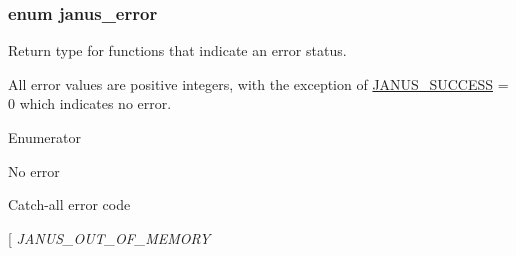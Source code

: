 \subsubsection[{janus\+\_\+error}]{\setlength{\rightskip}{0pt plus 5cm}enum {\bf janus\+\_\+error}}\label{group__janus_ga1b275e4dade484951b366f785597b8f6}


Return type for functions that indicate an error status. 

All error values are positive integers, with the exception of \hyperlink{group__janus_gga1b275e4dade484951b366f785597b8f6ab0b46979b869e754aba5c82530126aee}{J\+A\+N\+U\+S\+\_\+\+S\+U\+C\+C\+E\+S\+S} = 0 which indicates no error. \begin{Desc}
\item[Enumerator]\par
\begin{description}
\item[{\em 
\hypertarget{group__janus_gga1b275e4dade484951b366f785597b8f6ab0b46979b869e754aba5c82530126aee}{}J\+A\+N\+U\+S\+\_\+\+S\+U\+C\+C\+E\+S\+S\label{group__janus_gga1b275e4dade484951b366f785597b8f6ab0b46979b869e754aba5c82530126aee}
}]No error \item[{\em 
\hypertarget{group__janus_gga1b275e4dade484951b366f785597b8f6a5c509838668d50452b83af7a1091d3ff}{}J\+A\+N\+U\+S\+\_\+\+U\+N\+K\+N\+O\+W\+N\+\_\+\+E\+R\+R\+O\+R\label{group__janus_gga1b275e4dade484951b366f785597b8f6a5c509838668d50452b83af7a1091d3ff}
}]Catch-\/all error code \item[{\em 
\hypertarget{group__janus_gga1b275e4dade484951b366f785597b8f6a464d2a7dcfd2575f99dd3fabd6728b20}{}J\+A\+N\+U\+S\+\_\+\+O\+U\+T\+\_\+\+O\+F\+\_\+\+M\+E\+M\+O\+R\+Y\label{group__janus_gga1b275e4dade484951b366f785597b8f6a464d2a7dcfd2575f99dd3fabd6728b20}
}
\end{description}
\end{Desc}
